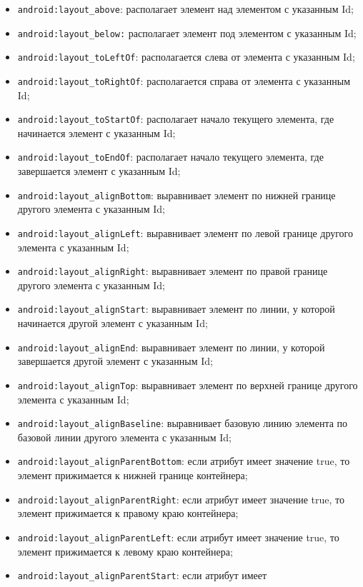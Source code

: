 \begin{itemize}
	\item \texttt{android:layout\_above}: располагает элемент над
		элементом с указанным Id;
	\item \texttt{android:layout\_below:} располагает элемент под
		элементом с указанным Id;
	\item \texttt{android:layout\_toLeftOf}: располагается слева от
		элемента с указанным Id;
	\item \texttt{android:layout\_toRightOf}: располагается справа от
		элемента с указанным Id;
	\item \texttt{android:layout\_toStartOf}: располагает начало текущего
		элемента, где начинается элемент с указанным Id;
	\item \texttt{android:layout\_toEndOf}: располагает начало текущего
		элемента, где завершается элемент с указанным Id;
	\item \texttt{android:layout\_alignBottom}: выравнивает элемент по
		нижней границе другого элемента с указанным Id;
	\item \texttt{android:layout\_alignLeft}: выравнивает элемент по
		левой границе другого элемента с указанным Id;
	\item \texttt{android:layout\_alignRight}: выравнивает элемент по
		правой границе другого элемента с указанным Id;
	\item \texttt{android:layout\_alignStart}: выравнивает элемент по линии,
		у которой начинается другой элемент с указанным Id;
	\item \texttt{android:layout\_alignEnd}: выравнивает элемент по линии,
		у которой завершается другой элемент с указанным Id;
	\item \texttt{android:layout\_alignTop}: выравнивает элемент по верхней
		границе другого элемента с указанным Id;
	\item \texttt{android:layout\_alignBaseline}: выравнивает базовую линию
		элемента по базовой линии другого элемента с указанным Id;
	\item \texttt{android:layout\_alignParentBottom}: если атрибут имеет
		значение true, то элемент прижимается к нижней границе контейнера;
	\item \texttt{android:layout\_alignParentRight}: если атрибут имеет
		значение true, то элемент прижимается к правому краю контейнера;
	\item \texttt{android:layout\_alignParentLeft}: если атрибут имеет
		значение true, то элемент прижимается к левому краю контейнера;
	\item \texttt{android:layout\_alignParentStart}: если атрибут имеет

\end{itemize}
